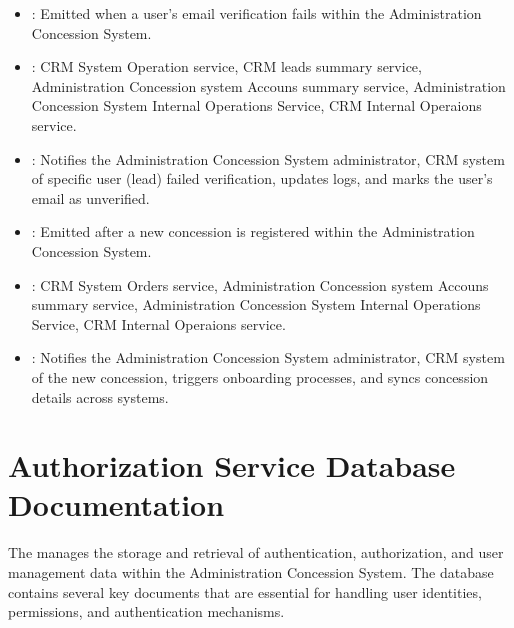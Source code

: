 \documentclass[letterpaper,10pt,english]{sphinxmanual}
\begin{document}
\sphinxAtStartPar
{}
\begin{itemize}
\item {} 
\sphinxAtStartPar
{}: Emitted when a user’s email verification fails within the Administration Concession System.

\item {} 
\sphinxAtStartPar
{}: CRM System Operation service, CRM leads summary service, Administration Concession system Accouns summary service, Administration Concession System Internal Operations Service, CRM Internal Operaions service.

\item {} 
\sphinxAtStartPar
{}: Notifies the Administration Concession System administrator, CRM system of specific user (lead) failed verification, updates logs, and marks the user’s email as unverified.

\end{itemize}

\sphinxAtStartPar
{}
\begin{itemize}
\item {} 
\sphinxAtStartPar
{}: Emitted after a new concession is registered within the Administration Concession System.

\item {} 
\sphinxAtStartPar
{}: CRM System Orders service, Administration Concession system Accouns summary service, Administration Concession System Internal Operations Service, CRM Internal Operaions service.

\item {} 
\sphinxAtStartPar
{}: Notifies the Administration Concession System administrator, CRM system of the new concession, triggers onboarding processes, and syncs concession details across systems.

\end{itemize}


\section{Authorization Service Database Documentation}
\label{\detokenize{administration_concession_system/authorization_service:authorization-service-database-documentation}}
\sphinxAtStartPar
The  manages the storage and retrieval of authentication, authorization, and user management data within the Administration Concession System. The database contains several key documents that are essential for handling user identities, permissions, and authentication mechanisms.
\end{document}
